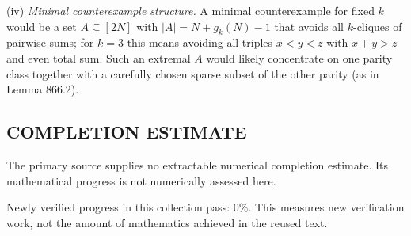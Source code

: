 (iv) \emph{Minimal counterexample structure.}
A minimal counterexample for fixed $k$ would be a set $A\subseteq[2N]$ with $|A|=N+g_k(N)-1$ that avoids all $k$-cliques of pairwise sums; for $k=3$ this means avoiding all triples $x<y<z$ with $x+y>z$ and even total sum.
Such an extremal $A$ would likely concentrate on one parity class together with a carefully chosen sparse subset of the other parity (as in Lemma 866.2).




\subsection*{COMPLETION ESTIMATE}
The primary source supplies no extractable numerical completion estimate. Its mathematical progress is not numerically assessed here.

Newly verified progress in this collection pass: $0\%$. This measures new verification work, not the amount of mathematics achieved in the reused text.
